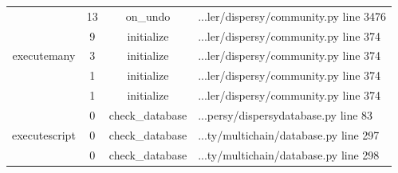 \begin{table}[!h]
{\begin{tabular}{|c|c|c|l|}
		\multicolumn{1}{|c|}{\multirow{5}{*}{executemany}} & \multicolumn{1}{c|}{13} & \multicolumn{1}{c|}{on\_undo} & \multicolumn{1}{l|}{...ler/dispersy/community.py line 3476} \\ \cline{2-4}
		\multicolumn{1}{|c|}{} & \multicolumn{1}{c|}{9}  & \multicolumn{1}{c|}{initialize}  & \multicolumn{1}{l|}{...ler/dispersy/community.py line 374}  \\ \cline{2-4} 
		\multicolumn{1}{|c|}{} & \multicolumn{1}{c|}{3}  & \multicolumn{1}{c|}{initialize}  & \multicolumn{1}{l|}{...ler/dispersy/community.py line 374}  \\ \cline{2-4} 
		\multicolumn{1}{|c|}{} & \multicolumn{1}{c|}{1}  & \multicolumn{1}{c|}{initialize}  & \multicolumn{1}{l|}{...ler/dispersy/community.py line 374}  \\ \cline{2-4} 
		\multicolumn{1}{|c|}{} & \multicolumn{1}{c|}{1}  & \multicolumn{1}{c|}{initialize}  & \multicolumn{1}{l|}{...ler/dispersy/community.py line 374}  \\ \hline 
		\multicolumn{1}{|c|}{\multirow{3}{*}{executescript}} & \multicolumn{1}{c|}{0} & \multicolumn{1}{c|}{check\_database} & \multicolumn{1}{l|}{...persy/dispersydatabase.py line 83} \\ \cline{2-4}
		\multicolumn{1}{|c|}{} & \multicolumn{1}{c|}{0}  & \multicolumn{1}{c|}{check\_database}  & \multicolumn{1}{l|}{...ty/multichain/database.py line 297}  \\ \cline{2-4} 
		\multicolumn{1}{|c|}{} & \multicolumn{1}{c|}{0}  & \multicolumn{1}{c|}{check\_database}  & \multicolumn{1}{l|}{...ty/multichain/database.py line 298}  \\ \hline 
		
	\end{tabular}}
\end{table}
	
